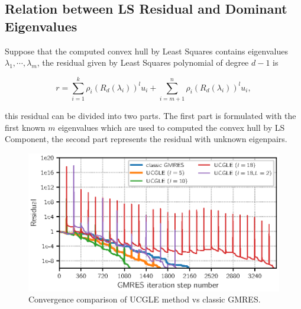 \subsection{Relation between LS Residual and Dominant Eigenvalues}

Suppose that the computed convex hull by Least Squares contains eigenvalues $\lambda_1,\cdots, \lambda_m$, the residual given by Least Squares polynomial of degree $d-1$ is

\begin{equation}
\label{rnk3}
r = \sum_{i=1}^{k}\rho_i (R_d(\lambda_i))^l u_i + \sum_{i=m+1}^{n}\rho_i (R_d(\lambda_i))^l u_i,
\end{equation}

this residual can be divided into two parts. The first part is formulated with the first known $m$ eigenvalues which are used to computed the convex hull by LS Component, the second part represents the residual with unknown eigenpairs.

\begin{figure}[htbp]
	\centering
	\includegraphics[width=6.2in]{fig/conv2.eps}
	\caption{Convergence comparison of UCGLE method vs classic GMRES.}
	\label{fig:convg}
\end{figure}

